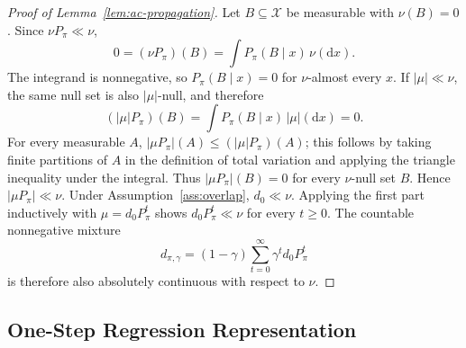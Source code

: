 \documentclass{article}
\newcommand{\sX}{\mathcal{X}}
\newcommand{\1}{\mathbf{1}}
\newcommand{\dd}{\mathrm{d}}
\newcommand{\Ppi}{P_\pi}
\newcommand{\dinit}{d_0}
\newcommand{\abs}[1]{\left\lvert #1 \right\rvert}
\theoremstyle{plain}
\theoremstyle{definition}
\theoremstyle{remark}
\begin{document}
\begin{proof}[Proof of Lemma~\ref{lem:ac-propagation}]
Let $B\subseteq\sX$ be measurable with $\nu(B)=0$.
Since $\nu\Ppi\ll\nu$,
\[
    0=(\nu\Ppi)(B)=\int \Ppi(B\mid x)\,\nu(\dd x).
\]
The integrand is nonnegative, so $\Ppi(B\mid x)=0$ for $\nu$-almost every $x$.
If $\abs{\mu}\ll\nu$, the same null set is also $\abs{\mu}$-null, and therefore
\[
    (\abs{\mu}\Ppi)(B)=\int \Ppi(B\mid x)\,\abs{\mu}(\dd x)=0.
\]
For every measurable $A$, $\abs{\mu\Ppi}(A)\leq(\abs{\mu}\Ppi)(A)$; this follows by taking finite partitions of $A$ in the definition of total variation and applying the triangle inequality under the integral.
Thus $\abs{\mu\Ppi}(B)=0$ for every $\nu$-null set $B$.
Hence $\abs{\mu\Ppi}\ll\nu$.
Under Assumption~\ref{ass:overlap}, $\dinit\ll\nu$. Applying the first part inductively
with $\mu=\dinit\Ppi^t$ shows $\dinit\Ppi^t\ll\nu$ for every $t\geq 0$.
The countable nonnegative mixture
\[
    d_{\pi,\gamma}
    =
    (1-\gamma)\sum_{t=0}^\infty \gamma^t\dinit\Ppi^t
\]
is therefore also absolutely continuous with respect to $\nu$.
\end{proof}

\subsection{One-Step Regression Representation}
\end{document}
